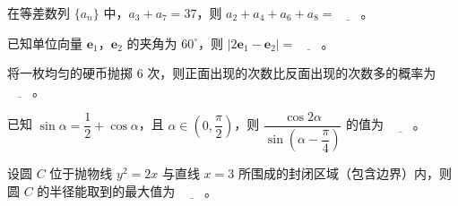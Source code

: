 \begin{question}
在等差数列 $\{a_n\}$ 中，$a_3+a_7=37$，则 $a_2+a_4+a_6+a_8=\underline{\qquad}$。

\end{question}
\begin{question}
已知单位向量 $\boldsymbol e_1$，$\boldsymbol e_2$ 的夹角为 $60^\circ$，则 $|2\boldsymbol e_1-\boldsymbol e_2|=\underline{\qquad}$。

\end{question}
\begin{question}
将一枚均匀的硬币抛掷 $6$ 次，则正面出现的次数比反面出现的次数多的概率为 $\underline{\qquad}$。

\end{question}
\begin{question}
已知 $\sin\alpha=\dfrac12+\cos\alpha$，且 $\alpha\in\left(0,\dfrac\pi2\right)$，则 $\dfrac{\cos2\alpha}{\sin\left(\alpha-\dfrac\pi4\right)}$ 的值为 $\underline{\qquad}$。

\end{question}
\begin{question}
设圆 $C$ 位于抛物线 $y^2=2x$ 与直线 $x=3$ 所围成的封闭区域（包含边界）内，则圆 $C$ 的半径能取到的最大值为 $\underline{\qquad}$。

\end{question}

